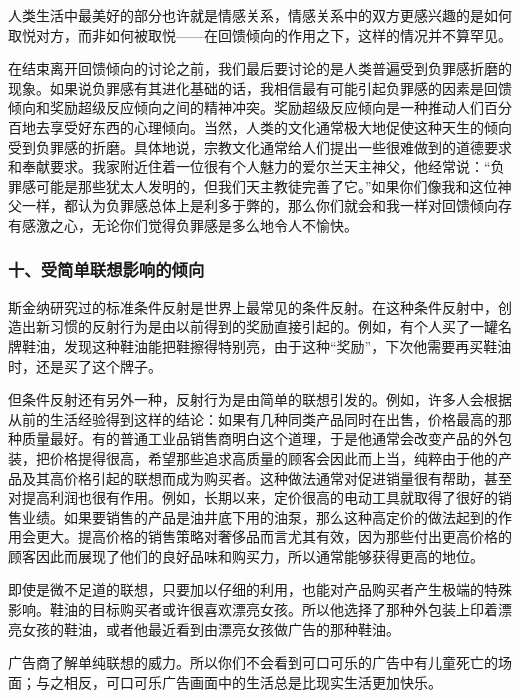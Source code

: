 人类生活中最美好的部分也许就是情感关系，情感关系中的双方更感兴趣的是如何取悦对方，而非如何被取悦——在回馈倾向的作用之下，这样的情况并不算罕见。
\par

在结束离开回馈倾向的讨论之前，我们最后要讨论的是人类普遍受到负罪感折磨的现象。如果说负罪感有其进化基础的话，我相信最有可能引起负罪感的因素是回馈倾向和奖励超级反应倾向之间的精神冲突。奖励超级反应倾向是一种推动人们百分百地去享受好东西的心理倾向。当然，人类的文化通常极大地促使这种天生的倾向受到负罪感的折磨。具体地说，宗教文化通常给人们提出一些很难做到的道德要求和奉献要求。我家附近住着一位很有个人魅力的爱尔兰天主神父，他经常说：“负罪感可能是那些犹太人发明的，但我们天主教徒完善了它。”如果你们像我和这位神父一样，都认为负罪感总体上是利多于弊的，那么你们就会和我一样对回馈倾向存有感激之心，无论你们觉得负罪感是多么地令人不愉快。
\par

\subsubsection*{十、受简单联想影响的倾向}

斯金纳研究过的标准条件反射是世界上最常见的条件反射。在这种条件反射中，创造出新习惯的反射行为是由以前得到的奖励直接引起的。例如，有个人买了一罐名牌鞋油，发现这种鞋油能把鞋擦得特别亮，由于这种“奖励”，下次他需要再买鞋油时，还是买了这个牌子。
\par

但条件反射还有另外一种，反射行为是由简单的联想引发的。例如，许多人会根据从前的生活经验得到这样的结论：如果有几种同类产品同时在出售，价格最高的那种质量最好。有的普通工业品销售商明白这个道理，于是他通常会改变产品的外包装，把价格提得很高，希望那些追求高质量的顾客会因此而上当，纯粹由于他的产品及其高价格引起的联想而成为购买者。这种做法通常对促进销量很有帮助，甚至对提高利润也很有作用。例如，长期以来，定价很高的电动工具就取得了很好的销售业绩。如果要销售的产品是油井底下用的油泵，那么这种高定价的做法起到的作用会更大。提高价格的销售策略对奢侈品而言尤其有效，因为那些付出更高价格的顾客因此而展现了他们的良好品味和购买力，所以通常能够获得更高的地位。
\par

即使是微不足道的联想，只要加以仔细的利用，也能对产品购买者产生极端的特殊影响。鞋油的目标购买者或许很喜欢漂亮女孩。所以他选择了那种外包装上印着漂亮女孩的鞋油，或者他最近看到由漂亮女孩做广告的那种鞋油。
\par

广告商了解单纯联想的威力。所以你们不会看到可口可乐的广告中有儿童死亡的场面；与之相反，可口可乐广告画面中的生活总是比现实生活更加快乐。
\par

